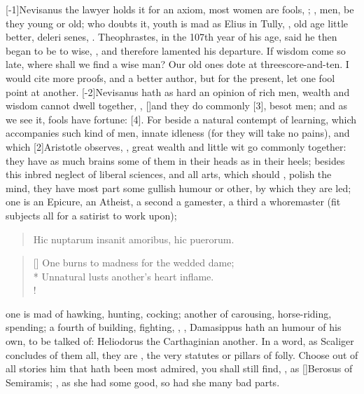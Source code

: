 [-1\baselineskip]Nevisanus the lawyer holds it for an axiom, most women are fools,
; \Seneca, men, be they young or old;
who doubts it, youth is mad as Elius in Tully, ,
old age little better, deleri senes, \etc{}. Theophrastes, in the 107th
year of his age, said he then began to be to wise, , and therefore lamented his departure. If wisdom come so late,
where shall we find a wise man? Our old ones dote at
threescore-and-ten. I would cite more proofs, and a better author, but
for the present, let one fool point at another. [-2\baselineskip]Nevisanus hath as
hard an opinion of rich men, wealth and wisdom cannot dwell
together, , [\baselineskip]and they do commonly
[3\baselineskip], besot men; and as we see it, fools have
fortune: [4\baselineskip]. For
beside a natural contempt of learning, which accompanies such kind of
men, innate idleness (for they will take no pains), and which
[2\baselineskip]Aristotle observes, , great wealth and little wit go
commonly together: they have as much brains some of them in their heads
as in their heels; besides this inbred neglect of liberal sciences, and
all arts, which should , polish the mind, they have most
part some gullish humour or other, by which they are led; one is an
Epicure, an Atheist, a second a gamester, a third a whoremaster (fit
subjects all for a satirist to work upon);
%
\begin{verse}
\textlatin{Hic nuptarum insanit amoribus, hic puerorum.}
\end{verse}
\translationrule
\settowidth{\versewidth}{One burns to madness for the wedded dame;}
\begin{verse}[\versewidth]
One burns to madness for the wedded dame;\\*
Unnatural lusts another's heart inflame.\\!
\end{verse}

one is mad of hawking, hunting, cocking; another of carousing,
horse-riding, spending; a fourth of building, fighting, \etc{}, , Damasippus hath an humour of his
own, to be talked of: Heliodorus the Carthaginian another. In a
word, as Scaliger concludes of them all, they are , the very statutes or pillars of folly. Choose out of all
stories him that hath been most admired, you shall still find, , as [\baselineskip]Berosus of
Semiramis; , as she had some good, so
had she many bad parts.

